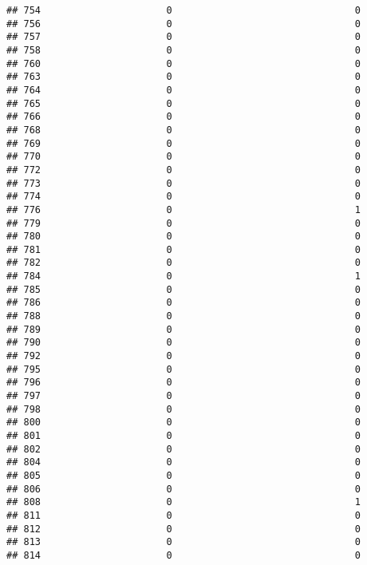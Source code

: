 \documentclass[
]{article}
\begin{document}
\begin{verbatim}
## 754                      0                                0
## 756                      0                                0
## 757                      0                                0
## 758                      0                                0
## 760                      0                                0
## 763                      0                                0
## 764                      0                                0
## 765                      0                                0
## 766                      0                                0
## 768                      0                                0
## 769                      0                                0
## 770                      0                                0
## 772                      0                                0
## 773                      0                                0
## 774                      0                                0
## 776                      0                                1
## 779                      0                                0
## 780                      0                                0
## 781                      0                                0
## 782                      0                                0
## 784                      0                                1
## 785                      0                                0
## 786                      0                                0
## 788                      0                                0
## 789                      0                                0
## 790                      0                                0
## 792                      0                                0
## 795                      0                                0
## 796                      0                                0
## 797                      0                                0
## 798                      0                                0
## 800                      0                                0
## 801                      0                                0
## 802                      0                                0
## 804                      0                                0
## 805                      0                                0
## 806                      0                                0
## 808                      0                                1
## 811                      0                                0
## 812                      0                                0
## 813                      0                                0
## 814                      0                                0

\end{verbatim}
\end{document}
